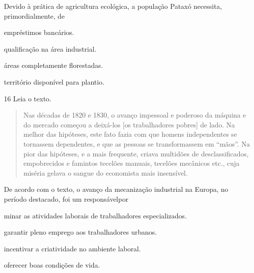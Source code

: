 \begin{escolha}
\begin{escolha}
\begin{escolha}
\begin{quote}
\end{quote}

Devido à prática de agricultura ecológica, a população Pataxó necessita,
primordialmente, de

\begin{escolha}
\item  empréstimos bancários.

\item  qualificação na área industrial.

\item  áreas completamente florestadas.

\item  território disponível para plantio.
\end{escolha}

\num{16} Leia o texto.

\begin{quote}
Nas décadas de 1820 e 1830, o avanço impessoal e poderoso da
máquina e do mercado começou a deixá-los [os trabalhadores pobres] de lado. Na melhor das
hipóteses, este fato fazia com que homens independentes se tornassem
dependentes, e que as pessoas se transformassem em ``mãos''. Na pior das
hipóteses, e a mais frequente, criava multidões de desclassificados,
empobrecidos e famintos tecelões manuais, tecelões mecânicos etc., cuja
miséria gelava o sangue do economista mais insensível.

\end{quote}

De acordo com o texto, o avanço da mecanização industrial na Europa, no
período destacado, foi um responsávelpor

\begin{escolha}
\item  minar as atividades laborais de trabalhadores especializados.

\item  garantir pleno emprego aos trabalhadores urbanos.

\item  incentivar a criatividade no ambiente laboral.

\item  oferecer boas condições de vida.
\end{escolha}


\end{escolha}
\end{escolha}
\end{escolha}
